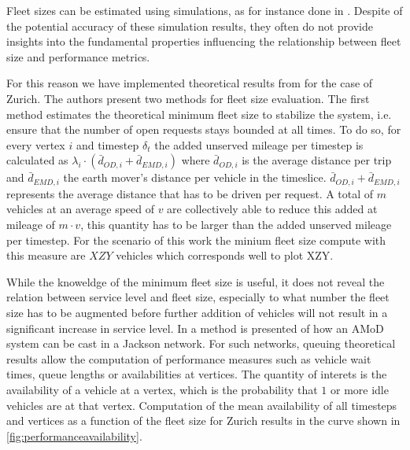 Fleet sizes can be estimated using simulations, as for instance done in \citep{bischoff2016simulation}. Despite of the potential accuracy of these simulation results, they often do not provide insights into the fundamental properties influencing the relationship between fleet size and performance metrics. 

For this reason we have implemented theoretical results from \citep{spieser2014toward} for the case of Zurich. The authors present two methods for fleet size evaluation. The first method estimates the theoretical minimum fleet size to stabilize the system, i.e. ensure that the number of open requests stays bounded at all times. To do so, for every vertex $i$ and timestep $\delta_t$ the added unserved mileage per timestep is calculated as $\lambda_i \cdot ( \bar{d}_{OD,i}  + \bar{d}_{EMD,i})$ where $\bar{d}_{OD,i}$ is the average distance per trip and  $\bar{d}_{EMD,i}$ the earth mover's distance per vehicle in the timeslice. $\bar{d}_{OD,i}  + \bar{d}_{EMD,i}$ represents the average distance that has to be driven per request. A total of $m$ vehicles at an average speed of $v$ are collectively able to reduce this added at mileage of $m \cdot v$, this quantity has to be larger than the added unserved mileage per timestep. For the scenario of this work the minium fleet size compute with this measure are $XZY $ vehicles which corresponds well to plot XZY. 

While the knoweldge of the minimum fleet size is useful, it does not reveal the relation between service level and fleet size, especially to what number the fleet size has to be augmented before further addition of vehicles will not result in a significant increase in service level. In \citep{zhang2016control} a method is presented of how an AMoD system can be cast in a Jackson network. For such networks, queuing theoretical results allow the computation of performance measures such as vehicle wait times, queue lengths or availabilities at vertices. The quantity of interets is the availability of a vehicle at a vertex, which is the probability that $1$ or more idle vehicles are at that vertex. Computation of the mean availability of all timesteps and vertices as a function of the fleet size for Zurich results in the curve shown in \ref{fig:performanceavailability}.

